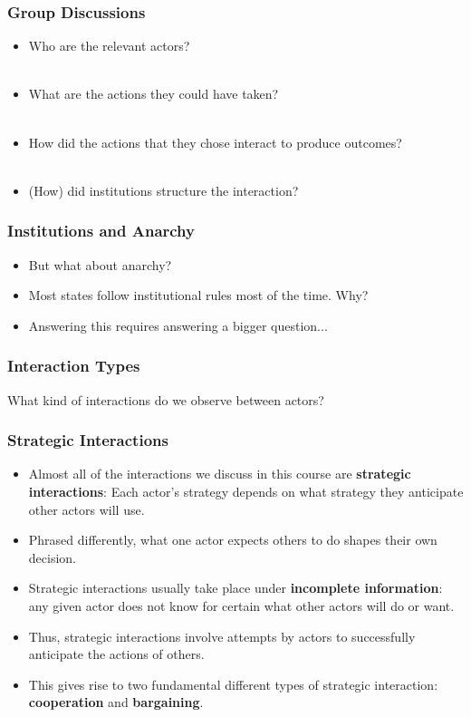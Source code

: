 \documentclass[handout]{beamer}
\begin{document}
\begin{frame} 
	\frametitle{\LARGE{Group Discussions}}
	\begin{itemize}
		\item Who are the relevant actors?
		\\~\\
		\item What are the actions they could have taken? 
		\\~\\ 
		\item How did the actions that they chose interact to produce outcomes? 
		\\~\\ 
		\item (How) did institutions structure the interaction? 
	\end{itemize}
\end{frame}
	
\begin{frame} 
	\frametitle{\LARGE{Institutions and Anarchy}}	
	\begin{itemize}
		\item But what about anarchy? \pause
		\item Most states follow institutional rules most of the time. Why? \pause
		\item Answering this requires answering a bigger question...
	\end{itemize}
\end{frame}

\begin{frame} 
	\frametitle{\LARGE{Interaction Types}}
	\centering
\LARGE{What kind of interactions do we observe between actors?}
\end{frame}

\begin{frame} 
	\frametitle{\LARGE{Strategic Interactions}}
	\begin{itemize}
		\item Almost all of the interactions we discuss in this course are \textbf{strategic interactions}: Each actor’s strategy depends on what strategy they anticipate other actors will use. \pause
		\item Phrased differently, what one actor expects others to do shapes their own decision. \pause
		\item Strategic interactions usually take place under \textbf{incomplete information}: any given actor does not know for certain what other actors will do or want. \pause
		\item Thus, strategic interactions involve attempts by actors to successfully anticipate the actions of others.  \pause
		\item This gives rise to two fundamental different types of strategic interaction: \textbf{cooperation} and \textbf{bargaining}.
	\end{itemize}
\end{frame}
\end{document}
